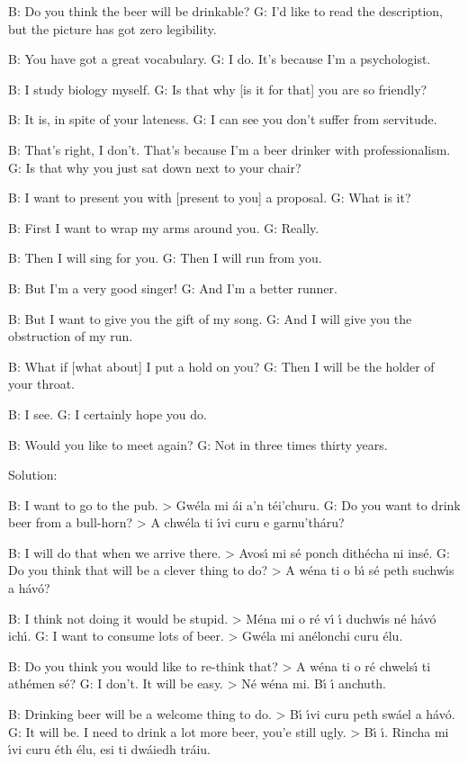 B: Do you think the beer will be drinkable?
G: I'd like to read the description, but the picture has got zero legibility.

B: You have got a great vocabulary.
G: I do. It's because I'm a psychologist.

B: I study biology myself.
G: Is that why [is it for that] you are so friendly?

B: It is, in spite of your lateness.
G: I can see you don't suffer from servitude.

B: That's right, I don't. That's because I'm a beer drinker with professionalism.
G: Is that why you just sat down next to your chair?

B: I want to present you with [present to you] a proposal.
G: What is it?

B: First I want to wrap my arms around you.
G: Really.

B: Then I will sing for you.
G: Then I will run from you.

B: But I'm a very good singer!
G: And I'm a better runner.

B: But I want to give you the gift of my song.
G: And I will give you the obstruction of my run.

B: What if [what about] I put a hold on you?
G: Then I will be the holder of your throat.

B: I see.
G: I certainly hope you do.

B: Would you like to meet again?
G: Not in three times thirty years.

\newpage
Solution:

B: I want to go to the pub. > Gw\'{e}la mi \'{a}i a'n t\'{e}i'churu.
G: Do you want to drink beer from a bull-horn? > A chw\'{e}la ti \'{\i}vi curu e garnu'th\'{a}ru?

B: I will do that when we arrive there. > Avos\'{\i} mi s\'{e} ponch dith\'{e}cha ni ins\'{e}.
G: Do you think that will be a clever thing to do? > A w\'{e}na ti o b\'{\i} s\'{e} peth suchw\'{\i}s a h\'{a}v\'{o}?

B: I think not doing it would be stupid. > M\'{e}na mi o r\'{e} v\'{\i} \'{\i} duchw\'{\i}s n\'{e} h\'{a}v\'{o} ich\'{\i}.
G: I want to consume lots of beer. > Gw\'{e}la mi an\'{e}lonchi curu \'{e}lu.

B: Do you think you would like to re-think that? > A w\'{e}na ti o r\'{e} chwels\'{\i} ti ath\'{e}men s\'{e}?
G: I don't. It will be easy. > N\'{e} w\'{e}na mi. B\'{\i} \'{\i} anchuth.

B: Drinking beer will be a welcome thing to do. > B\'{\i} \'{\i}vi curu peth sw\'{a}el a h\'{a}v\'{o}.
G: It will be. I need to drink a lot more beer, you'e still ugly. > B\'{\i} \'{\i}. Rincha mi \'{\i}vi curu \'{e}th \'{e}lu, esi ti dw\'{a}iedh tr\'{a}iu.

